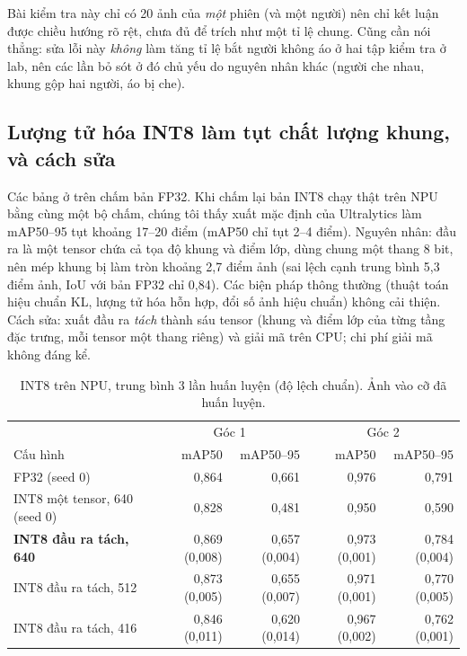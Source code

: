 \documentclass[12pt,a4paper]{article}
\begin{document}
Bài kiểm tra này chỉ có 20 ảnh của \emph{một} phiên (và một người) nên chỉ kết luận được chiều hướng rõ rệt, chưa đủ
để trích như một tỉ lệ chung. Cũng cần nói thẳng: sửa lỗi này \emph{không} làm tăng tỉ lệ bắt người không áo ở hai tập
kiểm tra ở lab, nên các lần bỏ sót ở đó chủ yếu do nguyên nhân khác (người che nhau, khung gộp hai người, áo bị che).

\subsection{Lượng tử hóa INT8 làm tụt chất lượng khung, và cách sửa}
\label{sec:int8}

Các bảng ở trên chấm bản FP32. Khi chấm lại bản INT8 chạy thật trên NPU bằng cùng một bộ chấm, chúng tôi thấy xuất
mặc định của Ultralytics làm mAP50--95 tụt khoảng 17--20 điểm (mAP50 chỉ tụt 2--4 điểm). Nguyên nhân: đầu ra là một
tensor chứa cả tọa độ khung và điểm lớp, dùng chung một thang 8 bit, nên mép khung bị làm tròn khoảng 2,7 điểm ảnh
(sai lệch cạnh trung bình 5,3 điểm ảnh, IoU với bản FP32 chỉ 0,84). Các biện pháp thông thường (thuật toán hiệu chuẩn KL,
lượng tử hóa hỗn hợp, đổi số ảnh hiệu chuẩn) không cải thiện. Cách sửa: xuất đầu ra \emph{tách} thành sáu tensor (khung
và điểm lớp của từng tầng đặc trưng, mỗi tensor một thang riêng) và giải mã trên CPU; chi phí giải mã không đáng kể.

\begin{table}[ht]
\centering
\caption{INT8 trên NPU, trung bình 3 lần huấn luyện (độ lệch chuẩn). Ảnh vào cỡ đã huấn luyện.}
\label{tab:int8}
\small
\begin{tabular}{lrrrr}
\toprule
 & \multicolumn{2}{c}{Góc 1} & \multicolumn{2}{c}{Góc 2} \\
Cấu hình & mAP50 & mAP50--95 & mAP50 & mAP50--95 \\
\midrule
FP32 (seed 0) & 0,864 & 0,661 & 0,976 & 0,791 \\
INT8 một tensor, 640 (seed 0) & 0,828 & 0,481 & 0,950 & 0,590 \\
\textbf{INT8 đầu ra tách, 640} & 0,869 (0,008) & 0,657 (0,004) & 0,973 (0,001) & 0,784 (0,004) \\
INT8 đầu ra tách, 512 & 0,873 (0,005) & 0,655 (0,007) & 0,971 (0,001) & 0,770 (0,005) \\
INT8 đầu ra tách, 416 & 0,846 (0,011) & 0,620 (0,014) & 0,967 (0,002) & 0,762 (0,001) \\
\bottomrule
\end{tabular}
\end{table}
\end{document}
